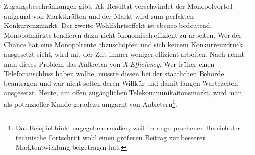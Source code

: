 Zugangsbeschränkungen gibt. Als Resultat verschwindet der Monopolvorteil aufgrund von Marktkräften und der Markt wird zum perfekten Konkurrenzmarkt. Der zweite Wohlfahrtseffekt ist ebenso bedeutend. Monopolmärkte tendieren dazu nicht ökonomisch effizient zu arbeiten. Wer der Chance hat eine Monopolrente abzuschöpfen und sich keinem Konkurrenzdruck ausgesetzt sieht, wird mit der Zeit immer weniger effizient arbeiten. Nach \textcite{Leibenstein1966} nennt man dieses Problem das Auftreten von \textit{X-Efficiency}. Wer früher einen Telefonanschluss haben wollte, musste diesen bei der staatlichen Behörde beantragen und war nicht selten deren Willkür und damit langen Wartezeiten ausgesetzt. Heute, am offen zugänglichen Telekommunikationsmarkt, wird man als potenzieller Kunde geradezu umgarnt von Anbietern\footnote{Das Beispiel hinkt zugegebenermaßen, weil im angesprochenen Bereich der technische Fortschritt wohl einen größeren Beitrag zur besseren Marktentwicklung beigetragen hat.}. 
